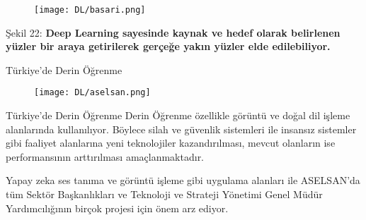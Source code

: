 \documentclass{beamer}                                                                                          %
\begin{document}
    
    \begin{frame}{}
        \begin{figure}[h!]
            \central
            \texttt{[image: DL/basari.png]}
        \end{figure}\par 
        \centering
        \color{myred1}Şekil 22:\color{black} \textbf{Deep Learning sayesinde kaynak ve hedef olarak belirlenen yüzler bir araya getirilerek gerçeğe yakın yüzler elde edilebiliyor.}
    \end{frame}
    
        
        \begin{frame}{Türkiye'de Derin Öğrenme}
            \begin{center}
            \begin{figure}
                \vspace*{-7mm}
                \hspace*{-70.5 pt}
                \centering
                \texttt{[image: DL/aselsan.png]}
            \end{figure}
        \end{center}
        \end{frame}
        
    
    \begin{frame}{Türkiye'de Derin Öğrenme}
	        \justifying
	        \color{myred1} \color{black}Derin Öğrenme özellikle görüntü ve doğal dil işleme alanlarında kullanılıyor. Böylece silah ve güvenlik sistemleri ile insansız sistemler gibi faaliyet alanlarına yeni teknolojiler kazandırılması, mevcut olanların ise performansının arttırılması amaçlanmaktadır.\par \vspace{20}
            \color{myred1} \color{black}Yapay zeka ses tanıma ve görüntü işleme gibi uygulama alanları ile ASELSAN’da tüm Sektör Başkanlıkları ve Teknoloji ve Strateji Yönetimi Genel Müdür Yardımcılığının birçok projesi için önem arz ediyor.\par \vspace{5}
    \end{frame}
    
\end{document}
